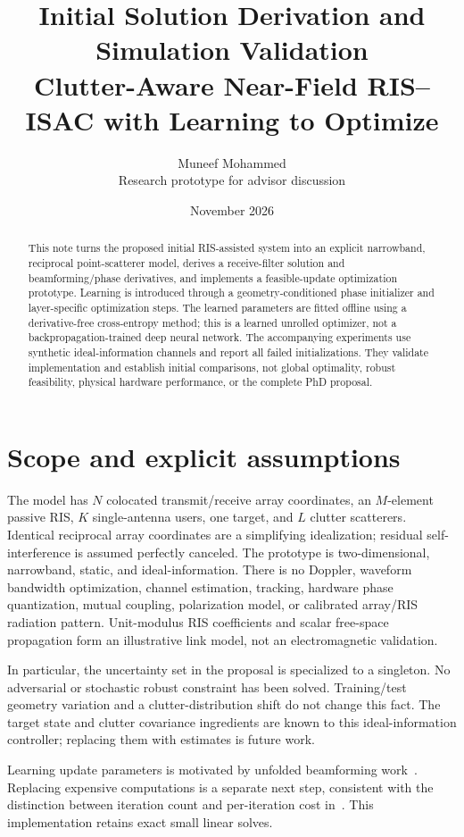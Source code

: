 \documentclass[11pt,a4paper]{article}
\title{Initial Solution Derivation and Simulation Validation\\\large Clutter-Aware Near-Field RIS--ISAC with Learning to Optimize}
\author{Muneef Mohammed\\\small Research prototype for advisor discussion}
\date{November 2026}
\begin{document}
\maketitle
\begin{abstract}
This note turns the proposed initial RIS-assisted system into an explicit narrowband, reciprocal point-scatterer model, derives a receive-filter solution and beamforming/phase derivatives, and implements a feasible-update optimization prototype. Learning is introduced through a geometry-conditioned phase initializer and layer-specific optimization steps. The learned parameters are fitted offline using a derivative-free cross-entropy method; this is a learned unrolled optimizer, not a backpropagation-trained deep neural network. The accompanying experiments use synthetic ideal-information channels and report all failed initializations. They validate implementation and establish initial comparisons, not global optimality, robust feasibility, physical hardware performance, or the complete PhD proposal.
\end{abstract}

\section{Scope and explicit assumptions}
The model has $N$ colocated transmit/receive array coordinates, an $M$-element passive RIS, $K$ single-antenna users, one target, and $L$ clutter scatterers. Identical reciprocal array coordinates are a simplifying idealization; residual self-interference is assumed perfectly canceled. The prototype is two-dimensional, narrowband, static, and ideal-information. There is no Doppler, waveform bandwidth optimization, channel estimation, tracking, hardware phase quantization, mutual coupling, polarization model, or calibrated array/RIS radiation pattern. Unit-modulus RIS coefficients and scalar free-space propagation form an illustrative link model, not an electromagnetic validation.

In particular, the uncertainty set in the proposal is specialized to a singleton. No adversarial or stochastic robust constraint has been solved. Training/test geometry variation and a clutter-distribution shift do not change this fact. The target state and clutter covariance ingredients are known to this ideal-information controller; replacing them with estimates is future work.

Learning update parameters is motivated by unfolded beamforming work~\cite{nguyen2023unfolding}. Replacing expensive computations is a separate next step, consistent with the distinction between iteration count and per-iteration cost in~\cite{avrahami2026approx}. This implementation retains exact small linear solves.
\end{document}
